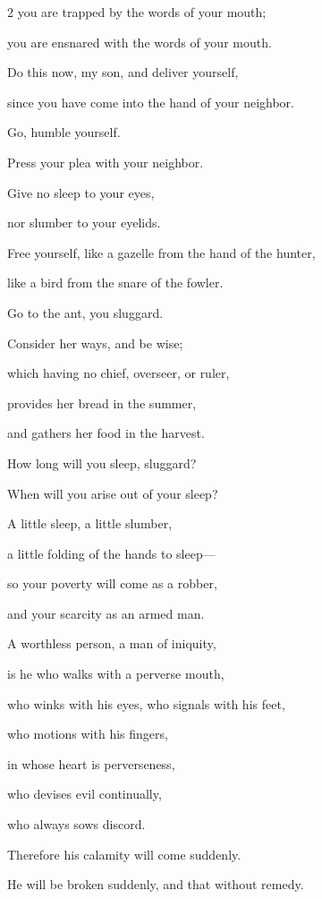 \begin{multicols}{2}
\myverse{}you are trapped by the words of your mouth;

you are ensnared with the words of your mouth.


\myverse{}Do this now, my son, and deliver yourself,

since you have come into the hand of your neighbor.

Go, humble yourself.

Press your plea with your neighbor.


\myverse{}Give no sleep to your eyes,

nor slumber to your eyelids.


\myverse{}Free yourself, like a gazelle from the hand of the hunter,

like a bird from the snare of the fowler.


\vspace{\baselineskip} 
\myverse{}Go to the ant, you sluggard.

Consider her ways, and be wise;


\myverse{}which having no chief, overseer, or ruler,


\myverse{}provides her bread in the summer,

and gathers her food in the harvest.


\myverse{}How long will you sleep, sluggard?

When will you arise out of your sleep?


\myverse{}A little sleep, a little slumber,

a little folding of the hands to sleep—


\myverse{}so your poverty will come as a robber,

and your scarcity as an armed man.


\vspace{\baselineskip} 
\myverse{}A worthless person, a man of iniquity,

is he who walks with a perverse mouth,


\myverse{}who winks with his eyes, who signals with his feet,

who motions with his fingers,


\myverse{}in whose heart is perverseness,

who devises evil continually,

who always sows discord.


\myverse{}Therefore his calamity will come suddenly.

He will be broken suddenly, and that without remedy.



\end{multicols}
